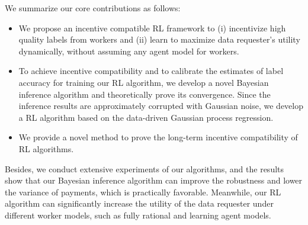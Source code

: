 


We summarize our core contributions as follows:
\begin{itemize}[topsep=0pt,  itemsep=0pt]
\item We propose an incentive compatible RL framework to (i) incentivize high quality labels from workers and (ii) learn to maximize data requester's utility dynamically, without assuming any agent model for workers.  
\item To achieve incentive compatibility and to calibrate the estimates of label accuracy for training our RL algorithm, we develop a novel Bayesian inference algorithm and theoretically prove its convergence. Since the inference results are approximately corrupted with Gaussian noise, we develop a RL algorithm based on the data-driven Gaussian process regression. 
\item We provide a novel method to prove the long-term incentive compatibility of RL algorithms.
\end{itemize}
Besides, we conduct extensive experiments of our algorithms, and the results show that our Bayesian inference algorithm can improve the robustness and lower the variance of payments, which is practically favorable. Meanwhile, our RL algorithm can significantly increase the utility of the data requester under different worker models, such as fully rational and learning agent models. 

